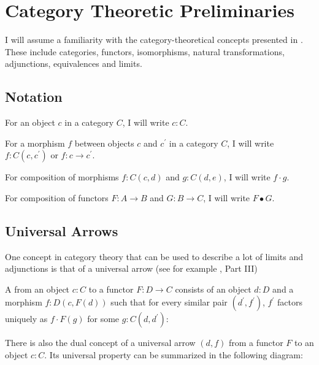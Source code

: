 \chapter{Category Theoretic Preliminaries}

I will assume a familiarity with the category-theoretical concepts presented in \autocite{CT4P}. These include categories, functors, isomorphisms, natural transformations, adjunctions, equivalences and limits.

\section{Notation}
For an object $ c $ in a category $ C $, I will write $ c: C $.

For a morphism $ f $ between objects $ c $ and $ c^\prime $ in a category $ C $, I will write $ f: C(c, c^\prime) $ or $ f: c \to c^\prime $.

For composition of morphisms $ f: C(c, d) $ and $ g: C(d, e) $, I will write $ f \cdot g $.

For composition of functors $ F: A \to B $ and $ G: B \to C $, I will write $ F \bullet G $.

\section{Universal Arrows}

One concept in category theory that can be used to describe a lot of limits and adjunctions is that of a universal arrow (see for example \autocite{MacLane}, Part III)
\begin{definition}
  A  from an object $ c: C $ to a functor $ F: D \to C $ consists of an object $ d: D $ and a morphism $ f: D(c, F(d)) $ such that for every similar pair $ (d^\prime, f^\prime) $, $ f^\prime $ factors uniquely as $ f \cdot F(g) $ for some $ g: C(d, d^\prime) $:
  \begin{center}
  \end{center}
\end{definition}

There is also the dual concept of a universal arrow $ (d, f) $ from a functor $ F $ to an object $ c: C $. Its universal property can be summarized in the following diagram:
\begin{center}
\end{center}

